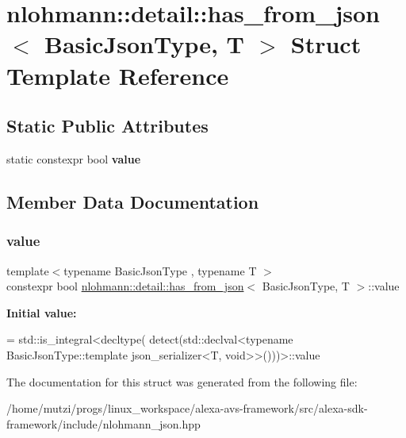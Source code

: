 \hypertarget{structnlohmann_1_1detail_1_1has__from__json}{}\section{nlohmann\+:\+:detail\+:\+:has\+\_\+from\+\_\+json$<$ Basic\+Json\+Type, T $>$ Struct Template Reference}
\label{structnlohmann_1_1detail_1_1has__from__json}
\subsection*{Static Public Attributes}
\begin{DoxyCompactItemize}
\item 
static constexpr bool {\bfseries value}
\end{DoxyCompactItemize}


\subsection{Member Data Documentation}
\mbox{\label{structnlohmann_1_1detail_1_1has__from__json_a16701d806343c58ae7e884024dd14955}} 
\subsubsection{\texorpdfstring{value}{value}}
{\footnotesize\ttfamily template$<$typename Basic\+Json\+Type , typename T $>$ \\
constexpr bool \hyperlink{structnlohmann_1_1detail_1_1has__from__json}{nlohmann\+::detail\+::has\+\_\+from\+\_\+json}$<$ Basic\+Json\+Type, T $>$\+::value\hspace{0.3cm}{\ttfamily [static]}}

{\bfseries Initial value\+:}
\begin{DoxyCode}
= std::is\_integral<decltype(
                                      detect(std::declval<\textcolor{keyword}{typename} BasicJsonType::template 
      json\_serializer<T, void>>()))>::value
\end{DoxyCode}


The documentation for this struct was generated from the following file\+:\begin{DoxyCompactItemize}
\item 
/home/mutzi/progs/linux\+\_\+workspace/alexa-\/avs-\/framework/src/alexa-\/sdk-\/framework/include/nlohmann\+\_\+json.\+hpp\end{DoxyCompactItemize}
